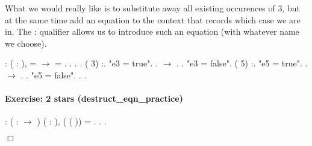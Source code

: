 \documentclass[12pt]{report}
\begin{document}
    What we would really like is to substitute away all existing
    occurences of   3, but at the same time add an equation
    to the context that records which case we are in.  The :
    qualifier allows us to introduce such an equation (with whatever
    name we choose). \begin{coqdoccode}
\coqdocemptyline
\coqdocnoindent
{}  : \coqdockw{\ensuremath{\forall}} ( : ),\coqdoceol
\coqdocindent{2.50em}
  =  \ensuremath{\rightarrow}\coqdoceol
\coqdocindent{2.50em}
  = .\coqdoceol
\coqdocnoindent
{}.\coqdoceol
\coqdocindent{1.00em}
  .    .\coqdoceol
\coqdocindent{1.00em}
 (  3) :.\coqdoceol
\coqdocindent{2.00em}
 "e3 = true".    .\coqdoceol
\coqdocindent{3.00em}
 \ensuremath{\rightarrow} . .\coqdoceol
\coqdocindent{2.00em}
 "e3 = false".\coqdoceol
\coqdocindent{3.00em}
 (  5) :.\coqdoceol
\coqdocindent{4.00em}
 "e5 = true".\coqdoceol
\coqdocindent{5.00em}
   .\coqdoceol
\coqdocindent{5.00em}
 \ensuremath{\rightarrow} . .\coqdoceol
\coqdocindent{4.00em}
 "e5 = false".  . .\coqdoceol
\coqdocemptyline
\end{coqdoccode}
\paragraph{Exercise: 2 stars (destruct\_eqn\_practice)}

\begin{coqdoccode}
\coqdocnoindent
{}  : \coqdoceol
\coqdocindent{1.00em}
\coqdockw{\ensuremath{\forall}} ( :  \ensuremath{\rightarrow} ) ( : ), \coqdoceol
\coqdocindent{1.00em}
 ( ( )) =  .\coqdoceol
\coqdocnoindent
{}.\coqdoceol
 .\coqdoceol
\end{coqdoccode}
\ensuremath{\Box} 
\end{document}
